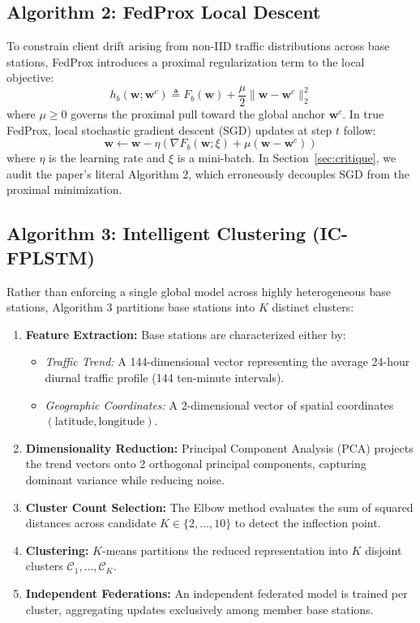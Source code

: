 \documentclass[10pt,journal,compsoc,twocolumn]{article}
\begin{document}
\subsection{Algorithm 2: FedProx Local Descent}
To constrain client drift arising from non-IID traffic distributions across base stations, FedProx introduces a proximal regularization term to the local objective:
\begin{equation}
    h_b(\mathbf{w}; \mathbf{w}^c) \triangleq F_b(\mathbf{w}) + \frac{\mu}{2} \|\mathbf{w} - \mathbf{w}^c\|_2^2
    \label{eq:fedprox_obj}
\end{equation}
where $\mu \ge 0$ governs the proximal pull toward the global anchor $\mathbf{w}^c$. In true FedProx, local stochastic gradient descent (SGD) updates at step $t$ follow:
\begin{equation}
    \mathbf{w} \leftarrow \mathbf{w} - \eta \left( \nabla F_b(\mathbf{w}; \xi) + \mu (\mathbf{w} - \mathbf{w}^c) \right)
    \label{eq:true_fedprox_step}
\end{equation}
where $\eta$ is the learning rate and $\xi$ is a mini-batch. In Section~\ref{sec:critique}, we audit the paper's literal Algorithm 2, which erroneously decouples SGD from the proximal minimization.

\subsection{Algorithm 3: Intelligent Clustering (IC-FPLSTM)}
Rather than enforcing a single global model across highly heterogeneous base stations, Algorithm 3 partitions base stations into $K$ distinct clusters:
\begin{enumerate}
    \item \textbf{Feature Extraction:} Base stations are characterized either by:
    \begin{itemize}
        \item \textit{Traffic Trend:} A 144-dimensional vector representing the average 24-hour diurnal traffic profile (144 ten-minute intervals).
        \item \textit{Geographic Coordinates:} A 2-dimensional vector of spatial coordinates $(\text{latitude}, \text{longitude})$.
    \end{itemize}
    \item \textbf{Dimensionality Reduction:} Principal Component Analysis (PCA) projects the trend vectors onto 2 orthogonal principal components, capturing dominant variance while reducing noise.
    \item \textbf{Cluster Count Selection:} The Elbow method evaluates the sum of squared distances across candidate $K \in \{2, \dots, 10\}$ to detect the inflection point.
    \item \textbf{Clustering:} $K$-means partitions the reduced representation into $K$ disjoint clusters $\mathcal{C}_1, \dots, \mathcal{C}_K$.
    \item \textbf{Independent Federations:} An independent federated model is trained per cluster, aggregating updates exclusively among member base stations.
\end{enumerate}
\end{document}
